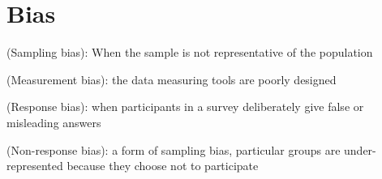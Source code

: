 \section{Bias}
\begin{definition}
    (Sampling bias): When the sample is not representative of the population
\end{definition}
\begin{definition}
    (Measurement bias): the data measuring tools are poorly designed
\end{definition}
\begin{definition}
    (Response bias): when participants in a survey deliberately give false or misleading answers
\end{definition}
\begin{definition}
    (Non-response bias): a form of sampling bias, particular groups are under-represented because they choose not to participate
\end{definition}
